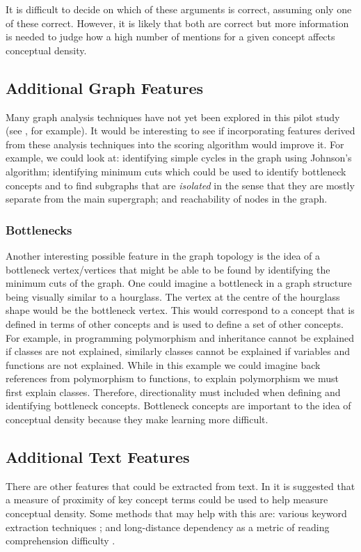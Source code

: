 \documentclass[12pt]{article}
\theoremstyle{grammarstyle}
\begin{document}
It is difficult to decide on which of these arguments is correct, assuming only one of these correct. However, it is likely that both are correct but more information is needed to judge how a high number of mentions for a given concept affects conceptual density.

\subsection{Additional Graph Features}
Many graph analysis techniques have not yet been explored in this pilot study (see \citep{algorithms_documentation}, for example). It would be interesting to see if incorporating features derived from these analysis techniques into the scoring algorithm would improve it. For example, we could look at: identifying simple cycles in the graph using Johnson's algorithm; identifying minimum cuts which could be used to identify bottleneck concepts and to find subgraphs that are \textit{isolated} in the sense that they are mostly separate from the main supergraph; and reachability of nodes in the graph.

\subsubsection{Bottlenecks} \label{sec:bottlenecks}
Another interesting possible feature in the graph topology is the idea of a bottleneck vertex/vertices that might be able to be found by identifying the minimum cuts of the graph. One could imagine a bottleneck in a graph structure being visually similar to a hourglass.
The vertex at the centre of the hourglass shape would be the bottleneck vertex. This would correspond to a concept that is defined in terms of other concepts and is used to define a set of other concepts. For example, in programming polymorphism and inheritance cannot be explained if classes are not explained, similarly classes cannot be explained if variables and functions are not explained. While in this example we could imagine back references from polymorphism to functions, to explain polymorphism we must first explain classes. Therefore, directionality must included when defining and identifying bottleneck concepts. Bottleneck concepts are important to the idea of conceptual density because they make learning more difficult.

\subsection{Additional Text Features}
There are other features that could be extracted from text.
In \citep{robins2010learning} it is suggested that a measure of proximity of key concept terms could be used to help measure conceptual density. Some methods that may help with this are: various keyword extraction techniques \citep{mihalcea2004textrank, matsuo2004keyword, ercan2007using, rose2010automatic}; and long-distance dependency as a metric of reading comprehension difficulty \citep{liu2008dependency}.
\end{document}

